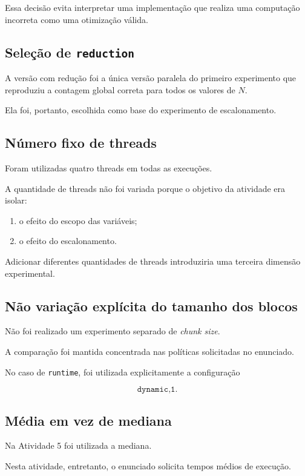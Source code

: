 Essa decisão evita interpretar uma implementação que realiza uma computação
incorreta como uma otimização válida.


\subsection{Seleção de \texttt{reduction}}

A versão com redução foi a única versão paralela do primeiro experimento que
reproduziu a contagem global correta para todos os valores de \(N\).

Ela foi, portanto, escolhida como base do experimento de escalonamento.


\subsection{Número fixo de threads}

Foram utilizadas quatro threads em todas as execuções.

A quantidade de threads não foi variada porque o objetivo da atividade era
isolar:

\begin{enumerate}
    \item o efeito do escopo das variáveis;
    \item o efeito do escalonamento.
\end{enumerate}

Adicionar diferentes quantidades de threads introduziria uma terceira
dimensão experimental.


\subsection{Não variação explícita do tamanho dos blocos}

Não foi realizado um experimento separado de \textit{chunk size}.

A comparação foi mantida concentrada nas políticas solicitadas no
enunciado.

No caso de \texttt{runtime}, foi utilizada explicitamente a configuração

\[
\texttt{dynamic,1}.
\]


\subsection{Média em vez de mediana}

Na Atividade 5 foi utilizada a mediana.

Nesta atividade, entretanto, o enunciado solicita tempos médios de
execução.

